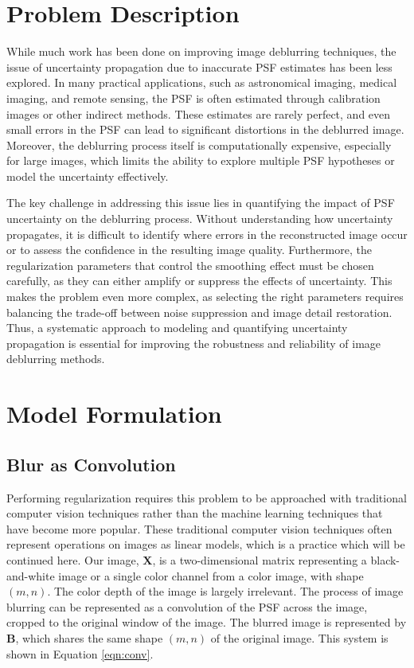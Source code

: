 \documentclass[letterpaper, 11pt, titlepage, twocolumn]{article}
\begin{document}
\section{Problem Description}
While much work has been done on improving image deblurring techniques, the issue of uncertainty propagation due to inaccurate PSF estimates has been less explored. In many practical applications, such as astronomical imaging, medical imaging, and remote sensing, the PSF is often estimated through calibration images or other indirect methods. These estimates are rarely perfect, and even small errors in the PSF can lead to significant distortions in the deblurred image. Moreover, the deblurring process itself is computationally expensive, especially for large images, which limits the ability to explore multiple PSF hypotheses or model the uncertainty effectively.

The key challenge in addressing this issue lies in quantifying the impact of PSF uncertainty on the deblurring process. Without understanding how uncertainty propagates, it is difficult to identify where errors in the reconstructed image occur or to assess the confidence in the resulting image quality. Furthermore, the regularization parameters that control the smoothing effect must be chosen carefully, as they can either amplify or suppress the effects of uncertainty. This makes the problem even more complex, as selecting the right parameters requires balancing the trade-off between noise suppression and image detail restoration. Thus, a systematic approach to modeling and quantifying uncertainty propagation is essential for improving the robustness and reliability of image deblurring methods.


\section{Model Formulation}

\subsection{Blur as Convolution}
Performing regularization requires this problem to be approached with traditional computer vision techniques rather than the machine learning techniques that have become more popular. These traditional computer vision techniques often represent operations on images as linear models, which is a practice which will be continued here. Our image, $\mathbf{X}$, is a two-dimensional matrix representing a black-and-white image or a single color channel from a color image, with shape $(m,n)$. The color depth of the image is largely irrelevant. The process of image blurring can be represented as a convolution of the PSF across the image, cropped to the original window of the image. The blurred image is represented by $\mathbf{B}$, which shares the same shape $(m,n)$ of the original image. This system is shown in Equation \eqref{eqn:conv}.
\end{document}
